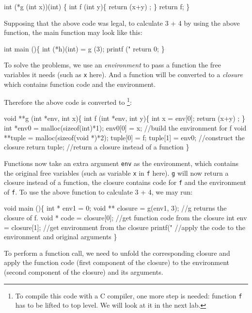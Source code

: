 \documentclass{article}
\theoremstyle{definition}
\theoremstyle{remark}
\numberwithin{equation}{section}
\begin{document}
\begin{code}
int (*g (int x))(int) \{
  int f (int y)\{
    return (x+y) ;
  \}
  return f;
\}
\end{code}

Supposing that the above code was legal, to calculate 3 + 4 by using the above
function, the main function may look like this:

\begin{code}
int main ()\{
  int (*h)(int) = g (3);
  printf ("%
  return 0;
\}
\end{code}


To solve the problems, we use an \emph{environment} to pass
a function the free variables it needs (such as \texttt{x} here). And
a function will be converted to a \emph{closure} which contains function code
and the environment.

Therefore the above code is converted to
\footnote{To compile this code with a C compiler, one more step is needed:
function \texttt{f} has to be lifted to top level. We will look at it
in the next lab.}:

\begin{code}
void **g (int *env, int x)\{
  int f (int *env, int y)\{
    int x = env[0];
    return (x+y) ;
  \}
  int *env0 = malloc(sizeof(int)*1);
  env0[0] = x;      //build the environment for f
  void **tuple = malloc(sizeof(void *)*2);
  tuple[0] = f;
  tuple[1] = env0;  //construct the closure
  return tuple;     //return a closure instead of a function
\}
\end{code}

Functions now take an extra argument \texttt{env} as the environment, which
contains the original free variables (such as variable \texttt{x} in \texttt{f} here).
\texttt{g} will now return a closure instead of a function, the closure contains
code for \texttt{f} and the environment of \texttt{f}. To use the above function
to calculate 3 + 4,
we may run:

\begin{code}
void main ()\{
  int * env1 = 0;
  void ** closure = g(env1, 3);  //g returns the closure of f.
  void * code = closure[0];   //get function code from the closure
  int env = closure[1];       //get environment from the closure
  printf("%
  //apply the code to the environment and original arguments
\}
\end{code}

To perform a function call, we need to unfold the
corresponding closure and apply the function code (first component of the
closure) to the environment (second component of the closure) and its arguments.
\end{document}
